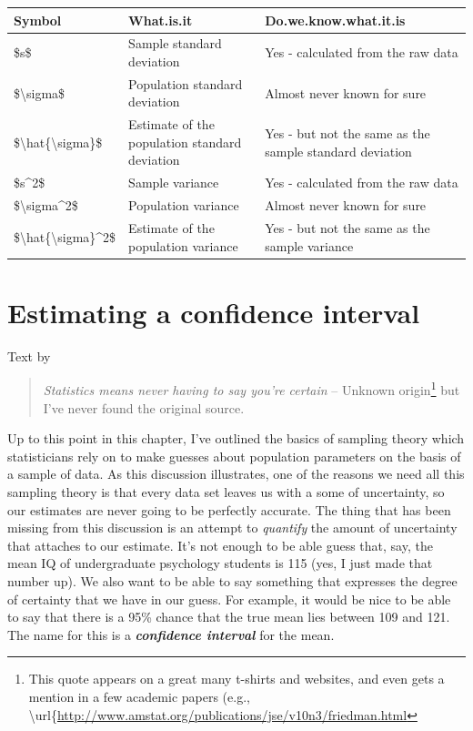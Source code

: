 \documentclass[
]{book}
\begin{document}
\begin{tabular}{l|l|l}
\hline
Symbol & What.is.it & Do.we.know.what.it.is\\
\hline
\$s\$ & Sample standard deviation & Yes - calculated from the raw data\\
\hline
\$\textbackslash{}sigma\$ & Population standard deviation & Almost never known for sure\\
\hline
\$\textbackslash{}hat\{\textbackslash{}sigma\}\$ & Estimate of the population standard deviation & Yes - but not the same as the sample standard deviation\\
\hline
\$s\textasciicircum{}2\$ & Sample variance & Yes - calculated from the raw data\\
\hline
\$\textbackslash{}sigma\textasciicircum{}2\$ & Population variance & Almost never known for sure\\
\hline
\$\textbackslash{}hat\{\textbackslash{}sigma\}\textasciicircum{}2\$ & Estimate of the population variance & Yes -  but not the same as the sample variance\\
\hline
\end{tabular}

\hypertarget{ci}{%
\section{Estimating a confidence interval}\label{ci}}

Text by \citet{Navarro2018}

\begin{quote}
\emph{Statistics means never having to say you're certain} -- Unknown origin\footnote{This quote appears on a great many t-shirts and websites, and even gets a mention in a few academic papers (e.g., \textbackslash url\{\url{http://www.amstat.org/publications/jse/v10n3/friedman.html}} but I've never found the original source.
\end{quote}

Up to this point in this chapter, I've outlined the basics of sampling theory which statisticians rely on to make guesses about population parameters on the basis of a sample of data. As this discussion illustrates, one of the reasons we need all this sampling theory is that every data set leaves us with a some of uncertainty, so our estimates are never going to be perfectly accurate. The thing that has been missing from this discussion is an attempt to \emph{quantify} the amount of uncertainty that attaches to our estimate. It's not enough to be able guess that, say, the mean IQ of undergraduate psychology students is 115 (yes, I just made that number up). We also want to be able to say something that expresses the degree of certainty that we have in our guess. For example, it would be nice to be able to say that there is a 95\% chance that the true mean lies between 109 and 121. The name for this is a \textbf{\emph{confidence interval}} for the mean.
\end{document}
